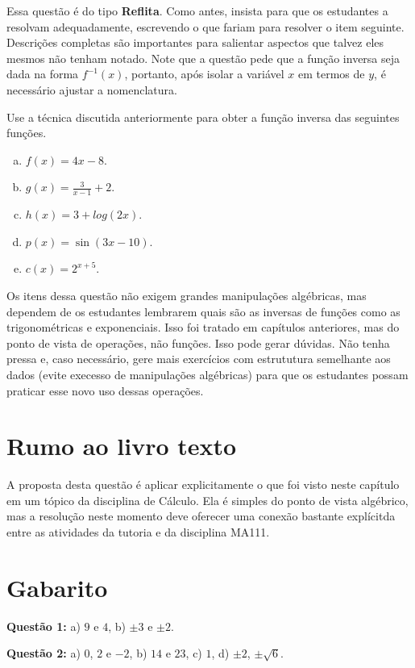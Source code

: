 \documentclass[main_estudante.tex]{subfiles}
\begin{document}
Essa questão é do tipo \textbf{Reflita}. Como antes, insista para que os estudantes a resolvam adequadamente, escrevendo o que fariam para resolver o item seguinte. Descrições completas são importantes para salientar aspectos que talvez eles mesmos não tenham notado. Note que a questão pede que a função inversa seja dada na forma $f^{-1}(x)$, portanto, após isolar a variável $x$ em termos de $y$, é necessário ajustar a nomenclatura.

\begin{questao}
Use a técnica discutida anteriormente para obter a função inversa das seguintes funções.
\begin{enumerate}[a)]
\item $f(x)=4x-8$.
\item $g(x)=\frac{3}{x-1}+2$.
\item $h(x)=3+log(2x)$.
\item $p(x)=\sin(3x-10)$.
\item $c(x)=2^{x+5}$.
\end{enumerate}
\end{questao}

Os itens dessa questão não exigem grandes manipulações algébricas, mas dependem de os estudantes lembrarem quais são as inversas de funções como as trigonométricas e exponenciais. Isso foi tratado em capítulos anteriores, mas do ponto de vista de operações, não funções. Isso pode gerar dúvidas. Não tenha pressa e, caso necessário, gere mais exercícios com estrututura semelhante aos dados (evite execesso de manipulações algébricas) para que os estudantes possam praticar esse novo uso dessas operações.

\section{Rumo ao livro texto}

A proposta desta questão é aplicar explicitamente o que foi visto neste capítulo em um tópico da disciplina de Cálculo. Ela é simples do ponto de vista algébrico, mas a resolução neste momento deve oferecer uma conexão bastante explícitda entre as atividades da tutoria e da disciplina MA111.

\section{Gabarito}

\noindent\textbf{Questão 1:} a) $9$ e $4$, b) $\pm3$ e $\pm2$.

\noindent\textbf{Questão 2:} a) $0$, $2$ e $-2$, b) $14$ e $23$, c) $1$, d) $\pm2$, $\pm\sqrt{6}$.
\end{document}
